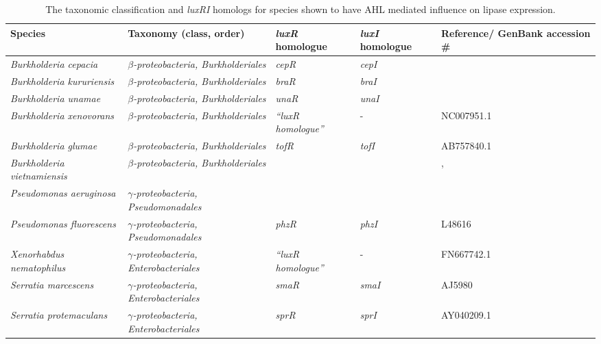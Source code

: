 \documentclass[11pt]{article}
\begin{document}
\begin{table}
\begin{tabular}{ | p{2.5cm} | p{3cm} | p{1.5cm} | p{1.5cm} | p{2.5cm} | }
\hline
Species & Taxonomy (class, order) & \emph{luxR} homologue & \emph{luxI} homologue & Reference/ GenBank accession \# \\
\hline
\emph{Burkholderia cepacia} & \emph{$\beta$-proteobacteria, Burkholderiales} & \emph{cepR} & \emph{cepI} & \cite{lewenza1999} \\
\hline
\emph{Burkholderia kururiensis} & \emph{$\beta$-proteobacteria, Burkholderiales} & \emph{braR} & \emph{braI} & \cite{suarez2008} \\
\hline
\emph{Burkholderia unamae} & \emph{$\beta$-proteobacteria, Burkholderiales} & \emph{unaR} & \emph{unaI} & \cite{suarez2010} \\
\hline
\emph{Burkholderia xenovorans} & \emph{$\beta$-proteobacteria, Burkholderiales} & \emph{“luxR homologue”} & - & NC007951.1 \\
\hline
\emph{Burkholderia glumae} & \emph{$\beta$-proteobacteria, Burkholderiales} & \emph{tofR} & \emph{tofI} & AB757840.1 \\
\hline
\emph{Burkholderia vietnamiensis} & \emph{$\beta$-proteobacteria, Burkholderiales} & \emph{} & \emph{} & \cite{conway_02}, \cite{ulrich2004}
 \\
\hline
\emph{Pseudomonas aeruginosa} & \emph{$\gamma$-proteobacteria, Pseudomonadales} & \emph{} & \emph{} & \cite{juhas2005} \\
\hline
\emph{Pseudomonas fluorescens} & \emph{$\gamma$-proteobacteria, Pseudomonadales} & \emph{phzR} & \emph{phzI} & L48616 \\
\hline
\emph{Xenorhabdus nematophilus} & \emph{$\gamma$-proteobacteria, Enterobacteriales} & \emph{“luxR homologue”} & - & FN667742.1 \\
\hline
\emph{Serratia marcescens} & \emph{$\gamma$-proteobacteria, Enterobacteriales} & \emph{smaR} & \emph{smaI} & AJ5980 \\
\hline
\emph{Serratia protemaculans} & \emph{$\gamma$-proteobacteria, Enterobacteriales} & \emph{sprR} & \emph{sprI} & AY040209.1 \\
\hline
\end{tabular}
\caption{The taxonomic classification and \emph{luxRI} homologs for species shown to have AHL mediated influence on lipase expression.}
\end{table}
\end{document}
